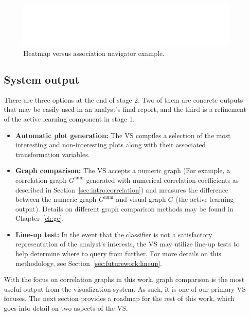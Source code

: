\begin{figure}[htb]
	\begin{center}
		\includegraphics[width=1\linewidth]{ch-visualizer/figures/heatmap}
		\caption[Heatmap versus association navigator]{Heatmap versus 
		association navigator example.}
		\label{fig:visualizer:heatmap}
	\end{center}
\end{figure}

\subsection{System output}
\label{sec:visualizer:plotgeneration:output}

There are three options at the end of stage 2. Two of them are concrete outputs 
that may be easily used in an analyst's final report, and the third is a 
refinement of the active learning component in stage 1.

\tablespacing
\begin{itemize}
	\item \textbf{Automatic plot generation:} The VS compiles a selection of 
	the most interesting and non-interesting plots along with their 
	associated transformation variables.
	\item \textbf{Graph comparison:} The VS accepts a numeric graph (For 
	example, a correlation graph $G^{\text{num}}$ generated with numerical 
	correlation 
	coefficients as described in Section~\ref{sec:intro:correlation}) and 
	measures the difference between the numeric graph $G^{\text{num}}$ and 
	visual graph $G$ (the active learning output). 
	Details on different graph comparison methods may be found in 
	Chapter~\ref{ch:gc}.
	\item \textbf{Line-up test:} In the event that the classifier is not a 
	satisfactory representation of the analyst's interests, the VS may utilize 
	line-up tests to help determine where to query from further. For more 
	details on this methodology, see Section~\ref{sec:futurework:lineup}.
\end{itemize}
\bodyspacing

With the focus on correlation graphs in this work, graph comparison is the most 
useful output from the visualization system. As such, it is one of our primary 
VS focuses. The next section provides a roadmap for the rest of this work, 
which goes into detail on two aspects of the VS. 